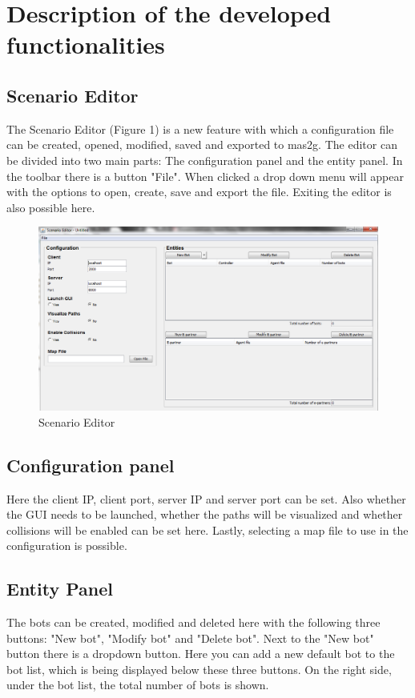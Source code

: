\documentclass{article}
\begin{document}
\section{Description of the developed functionalities}
\subsection{Scenario Editor}

The Scenario Editor (Figure 1) is a new feature with which a configuration file can be created, opened, modified, saved and exported to mas2g. The editor can be divided into two main parts: The configuration panel and the entity panel.
In the toolbar there is a button "File". When clicked a drop down menu will appear with the options to open, create, save and export the file. Exiting the editor is also possible here.

\begin{figure}[h]
\includegraphics[width=\textwidth]{scenario-editor.png}
\caption{Scenario Editor}
\end{figure}

\subsection{Configuration panel}
Here the client IP, client port, server IP and server port can be set. Also whether the GUI needs to be launched, whether the paths will be visualized and whether collisions will be enabled can be set here. Lastly, selecting a map file to use in the configuration is possible.

\subsection{Entity Panel}
The bots can be created, modified and deleted here with the following three buttons: "New bot", "Modify bot" and "Delete bot". Next to the "New bot" button there is a dropdown button. Here you can add a new default bot to the bot list, which is being displayed below these three buttons. On the right side, under the bot list, the total number of bots is shown.
\end{document}

